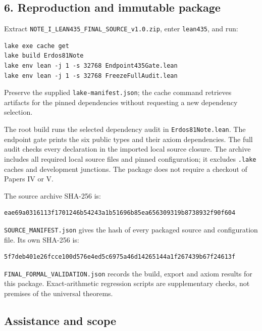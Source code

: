 \documentclass[english,11pt,a4paper]{article}
\begin{document}
\subsection{6. Reproduction and immutable
package}\label{reproduction-and-immutable-package}

Extract \nolinkurl{NOTE_I_LEAN435_FINAL_SOURCE_v1.0.zip}, enter
\nolinkurl{lean435}, and run:

\begin{verbatim}
lake exe cache get
lake build Erdos81Note
lake env lean -j 1 -s 32768 Endpoint435Gate.lean
lake env lean -j 1 -s 32768 FreezeFullAudit.lean
\end{verbatim}

Preserve the supplied \nolinkurl{lake-manifest.json}; the cache command
retrieves artifacts for the pinned dependencies without requesting a new
dependency selection.

The root build runs the selected dependency audit in
\nolinkurl{Erdos81Note.lean}. The endpoint gate prints the six public types
and their axiom dependencies. The full audit checks every declaration in
the imported local source closure. The archive includes all required
local source files and pinned configuration; it excludes \nolinkurl{.lake}
caches and development junctions. The package does not require a
checkout of Papers IV or V.

The source archive SHA-256 is:

\begin{verbatim}
eae69a0316113f1701246b54243a1b51696b85ea656309319b8738932f90f604
\end{verbatim}

\nolinkurl{SOURCE_MANIFEST.json} gives the hash of every packaged source
and configuration file. Its own SHA-256 is:

\begin{verbatim}
5f7deb401e26fcce100d576e4ed5c6975a46d14265144a1f267439b67f24613f
\end{verbatim}

\nolinkurl{FINAL_FORMAL_VALIDATION.json} records the build, export and
axiom results for this package. Exact-arithmetic regression scripts are
supplementary checks, not premises of the universal theorems.

\subsection{Assistance and scope}\label{assistance-and-scope}
\end{document}
